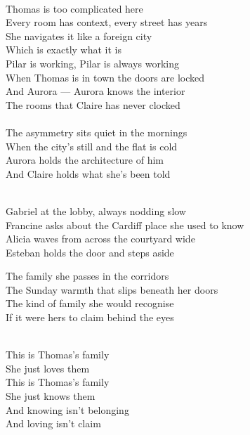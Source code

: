 \begin{lyrics}
\\
Thomas is too complicated here\\
Every room has context, every street has years\\
She navigates it like a foreign city\\
Which is exactly what it is\\
Pilar is working, Pilar is always working\\
When Thomas is in town the doors are locked\\
And Aurora — Aurora knows the interior\\
The rooms that Claire has never clocked\\
\\
The asymmetry sits quiet in the mornings\\
When the city's still and the flat is cold\\
Aurora holds the architecture of him\\
And Claire holds what she's been told\\

\\
Gabriel at the lobby, always nodding slow\\
Francine asks about the Cardiff place she used to know\\
Alicia waves from across the courtyard wide\\
Esteban holds the door and steps aside

The family she passes in the corridors\\
The Sunday warmth that slips beneath her doors\\
The kind of family she would recognise\\
If it were hers to claim behind the eyes

\\
This is Thomas's family\\
She just loves them\\
This is Thomas's family\\
She just knows them\\
And knowing isn't belonging\\
And loving isn't claim


\end{lyrics}
